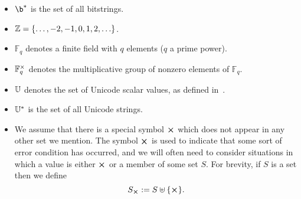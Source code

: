 \begin{itemize}
  \item $\b^*$ is the set of all bitstrings.%

  \item $\mathbb{Z} = \{\ldots, -2, -1, 0, 1, 2, \ldots\}$.%

  \item $\mathbb{F}_q$ denotes a finite field with $q$ elements ($q$ a prime power).%

  \item $\mathbb{F}_q^{\times}$ denotes the multiplicative group of nonzero elements of $\mathbb{F}_q$.%

  \item $\mathbb{U}$ denotes the set of Unicode scalar values, as defined in~\cite[Definition D76]{Unicode-standard}.%

  \item $\mathbb{U}^*$ is the set of all Unicode strings.%

  \item We assume that there is a special symbol $\errorX$ which does not appear
    in any other set we mention.  The symbol $\errorX$ is used to indicate that
    some sort of error condition has occurred, and we will often need to consider
    situations in which a value is either $\errorX$ or a member of some set $S$.
    For brevity, if $S$ is a set then we define
    $$
    \withError{S} := S \disj \{\errorX\}.
    $$%
\end{itemize}%

